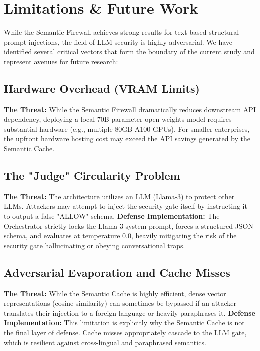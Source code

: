 \documentclass[12pt,a4paper]{article}
\begin{document}
\section{Limitations \& Future Work}

While the Semantic Firewall achieves strong results for text-based structural prompt injections, the field of LLM security is highly adversarial. We have identified several critical vectors that form the boundary of the current study and represent avenues for future research:

\subsection{Hardware Overhead (VRAM Limits)}
\textbf{The Threat:} While the Semantic Firewall dramatically reduces downstream API dependency, deploying a local 70B parameter open-weights model requires substantial hardware (e.g., multiple 80GB A100 GPUs). For smaller enterprises, the upfront hardware hosting cost may exceed the API savings generated by the Semantic Cache.

\subsection{The "Judge" Circularity Problem}
\textbf{The Threat:} The architecture utilizes an LLM (Llama-3) to protect other LLMs. Attackers may attempt to inject the security gate itself by instructing it to output a false "ALLOW" schema.
\textbf{Defense Implementation:} The Orchestrator strictly locks the Llama-3 system prompt, forces a structured JSON schema, and evaluates at temperature $0.0$, heavily mitigating the risk of the security gate hallucinating or obeying conversational traps.

\subsection{Adversarial Evaporation and Cache Misses}
\textbf{The Threat:} While the Semantic Cache is highly efficient, dense vector representations (cosine similarity) can sometimes be bypassed if an attacker translates their injection to a foreign language or heavily paraphrases it.
\textbf{Defense Implementation:} This limitation is explicitly why the Semantic Cache is not the final layer of defense. Cache misses appropriately cascade to the LLM gate, which is resilient against cross-lingual and paraphrased semantics. 
\end{document}
